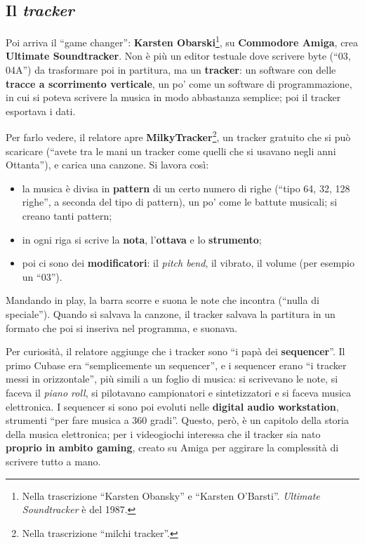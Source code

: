 \subsection{Il \emph{tracker}}

Poi arriva il ``game changer'': \textbf{Karsten Obarski}\footnote{Nella
trascrizione ``Karsten Obansky'' e ``Karsten O'Barsti''. \emph{Ultimate
Soundtracker} è del 1987.}, su \textbf{Commodore Amiga}, crea \textbf{Ultimate
Soundtracker}. Non è più un editor testuale dove scrivere byte (``03, 04A'') da
trasformare poi in partitura, ma un \textbf{tracker}: un software con delle
\textbf{tracce a scorrimento verticale}, un po' come un software di
programmazione, in cui si poteva scrivere la musica in modo abbastanza semplice;
poi il tracker esportava i dati.

Per farlo vedere, il relatore apre \textbf{MilkyTracker}\footnote{Nella
trascrizione ``milchi tracker''.}, un tracker gratuito che si può scaricare
(``avete tra le mani un tracker come quelli che si usavano negli anni
Ottanta''), e carica una canzone. Si lavora così:
\begin{itemize}
  \item la musica è divisa in \textbf{pattern} di un certo numero di righe
        (``tipo 64, 32, 128 righe'', a seconda del tipo di pattern), un po' come
        le battute musicali; si creano tanti pattern;
  \item in ogni riga si scrive la \textbf{nota}, l'\textbf{ottava} e lo
        \textbf{strumento};
  \item poi ci sono dei \textbf{modificatori}: il \emph{pitch bend}, il
        vibrato, il volume (per esempio un ``03'').
\end{itemize}
Mandando in play, la barra scorre e suona le note che incontra (``nulla di
speciale''). Quando si salvava la canzone, il tracker salvava la partitura in un
formato che poi si inseriva nel programma, e suonava.

Per curiosità, il relatore aggiunge che i tracker sono ``i papà dei
\textbf{sequencer}''. Il primo Cubase era ``semplicemente un sequencer'', e i
sequencer erano ``i tracker messi in orizzontale'', più simili a un foglio di
musica: si scrivevano le note, si faceva il \emph{piano roll}, si pilotavano
campionatori e sintetizzatori e si faceva musica elettronica. I sequencer si sono
poi evoluti nelle \textbf{digital audio workstation}, strumenti ``per fare musica
a 360 gradi''. Questo, però, è un capitolo della storia della musica
elettronica; per i videogiochi interessa che il tracker sia nato \textbf{proprio
in ambito gaming}, creato su Amiga per aggirare la complessità di scrivere tutto a
mano.

